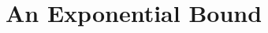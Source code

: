 \documentclass{patmorin}
\renewcommand{\ge}{\geqslant}
\renewcommand{\le}{\leqslant}
\DeclareMathOperator{\girth}{girth}
\DeclareMathOperator{\dist}{dist}
\begin{document}
\newpage

\section{An Exponential Bound}


%
%
%
%
%
%
%
%
%
%
%
%
%
%
%
%
\end{document}

